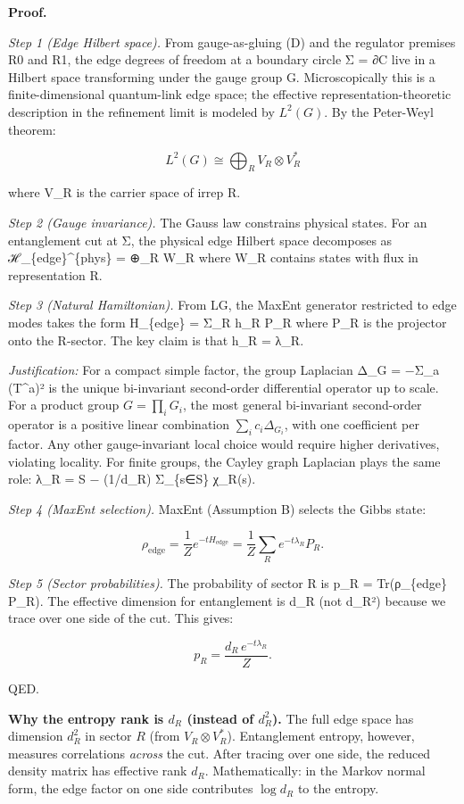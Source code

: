 \textbf{Proof.}

\emph{Step 1 (Edge Hilbert space).} From gauge-as-gluing (D) and the regulator premises R0 and R1, the edge degrees of freedom at a boundary circle Σ = ∂C live in a Hilbert space transforming under the gauge group G. Microscopically this is a finite-dimensional quantum-link edge space; the effective representation-theoretic description in the refinement limit is modeled by \(L^2(G)\). By the Peter-Weyl theorem:

\[
L^2(G) \cong \bigoplus_R V_R \otimes V_R^*
\]

where V\_R is the carrier space of irrep R.

\emph{Step 2 (Gauge invariance).} The Gauss law constrains physical states. For an entanglement cut at Σ, the physical edge Hilbert space decomposes as ℋ\_\{edge\}\^{}\{phys\} = ⊕\_R W\_R where W\_R contains states with flux in representation R.

\emph{Step 3 (Natural Hamiltonian).} From LG, the MaxEnt generator restricted to edge modes takes the form H\_\{edge\} = Σ\_R h\_R P\_R where P\_R is the projector onto the R-sector. The key claim is that h\_R = λ\_R.

\emph{Justification:} For a compact simple factor, the group Laplacian Δ\_G = −Σ\_a (T\^{}a)² is the unique bi-invariant second-order differential operator up to scale. For a product group \(G=\prod_i G_i\), the most general bi-invariant second-order operator is a positive linear combination \(\sum_i c_i \Delta_{G_i}\), with one coefficient per factor. Any other gauge-invariant local choice would require higher derivatives, violating locality. For finite groups, the Cayley graph Laplacian plays the same role: λ\_R = \textbar S\textbar{} − (1/d\_R) Σ\_\{s∈S\} χ\_R(s).

\emph{Step 4 (MaxEnt selection).} MaxEnt (Assumption B) selects the Gibbs state:

\[
\rho_{\mathrm{edge}} = \frac{1}{Z} e^{-t H_{\mathrm{edge}}} = \frac{1}{Z}
\sum_R e^{-t \lambda_R} P_R.
\]

\emph{Step 5 (Sector probabilities).} The probability of sector R is p\_R = Tr(ρ\_\{edge\} P\_R). The effective dimension for entanglement is d\_R (not d\_R²) because we trace over one side of the cut. This gives:

\[
p_R = \frac{d_R \, e^{-t \lambda_R}}{Z}.
\]

QED.

\textbf{Why the entropy rank is \(d_R\) (instead of \(d_R^2\)).} The full edge space has dimension \(d_R^2\) in sector \(R\) (from \(V_R \otimes V_R^\ast\)). Entanglement entropy, however, measures correlations \emph{across} the cut. After tracing over one side, the reduced density matrix has effective rank \(d_R\). Mathematically: in the Markov normal form, the edge factor on one side contributes \(\log d_R\) to the entropy.

